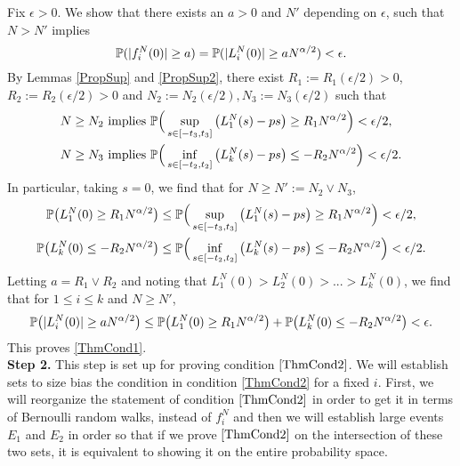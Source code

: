 	Fix $\epsilon>0$. We show that there exists an $a>0$ and $N'$ depending on $\epsilon$, such that $N>N'$ implies
	$$\mathbb{P}(|f^N_i(0)|\geq a) = \mathbb{P}(|L_i^N(0)|\geq a N^{\alpha/2})<\epsilon.$$
	By Lemmas \ref{PropSup} and \ref{PropSup2}, there exist $R_1 := R_1(\epsilon/2)>0$, $R_2 := R_2(\epsilon/2)>0$ and $N_2 := N_2(\epsilon/2),N_3 := N_3(\epsilon/2)$ such that 
	\begin{align*}
	N\geq N_2 &\text{ implies } \mathbb{P}\Big(\sup_{s\in[-t_3,t_3]}\left(L_1^N(s)-ps\right)\geq R_1N^{\alpha/2}\Big)<\epsilon/2,\\
	N\geq N_3 &\text{ implies } \mathbb{P}\Big(\inf_{s\in[-t_2,t_2]}\left(L_k^N(s)-ps\right)\leq -R_2 N^{\alpha/2}\Big)<\epsilon/2.
	\end{align*}
	In particular, taking $s=0$, we find that for $N\geq N' := N_2 \vee N_3$, 
	\begin{align*}
	\mathbb{P}\big(L_1^N(0)\geq R_1N^{\alpha/2}\big) &\leq \mathbb{P}\Big(\sup_{s\in[-t_3,t_3]}\left(L_1^N(s)-ps\right)\geq R_1N^{\alpha/2}\Big)< \epsilon/2,\\
	\mathbb{P}\big(L_k^N(0)\leq -R_2N^{\alpha/2}\big) &\leq \mathbb{P}\Big(\inf_{s\in[-t_2,t_2]}\left(L_k^N(s)-ps\right)\leq -R_2N^{\alpha/2}\Big)< \epsilon/2.
	\end{align*}
	Letting $a = R_1 \vee R_2$ and noting that $L_1^N(0)>L_2^N(0)>...>L_k^N(0)$, we find that for $1\leq i\leq k$ and $N \geq N'$,
	$$\mathbb{P}\big(|L_i^N(0)|\geq a N^{\alpha/2}\big)\leq \mathbb{P}\big(L_1^N(0)\geq R_1 N^{\alpha/2}\big) + \mathbb{P}\big(L_k^N(0)\leq -R_2N^{\alpha/2}\big) < \epsilon.$$
	This proves \eqref{ThmCond1}.\\
	
	\noindent\textbf{Step 2.} This step is set up for proving condition $\eqref{ThmCond2}$. We will establish sets to size bias the condition in  condition \eqref{ThmCond2} for a fixed $i$. First, we will reorganize the statement of condition $\eqref{ThmCond2}$ in order to get it in terms of Bernoulli random walks, instead of $f_i^N$ and then we will establish large events $E_1$ and $E_2$ in order so that if we prove $\eqref{ThmCond2}$ on the intersection of these two sets, it is equivalent to showing it on the entire probability space.
	
